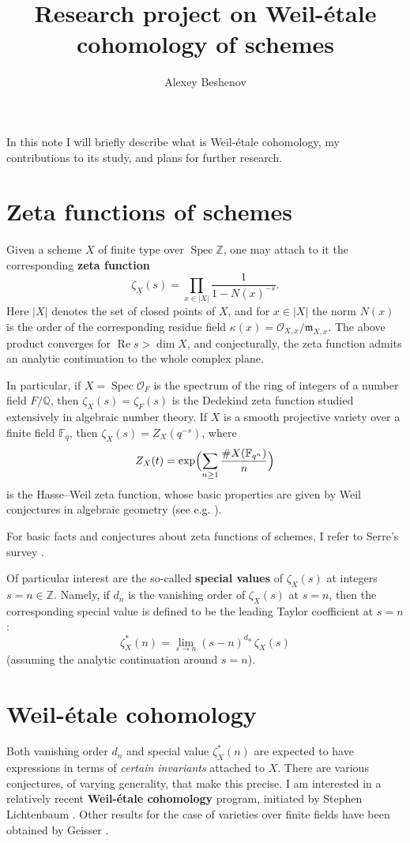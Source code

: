 \documentclass{article}
\author{Alexey Beshenov}
\title{Research project on Weil-étale cohomology of schemes}
\DeclareMathOperator{\Spec}{Spec}
\newcommand{\ZZ}{\mathbb{Z}}
\newcommand{\FF}{\mathbb{F}}
\newcommand{\QQ}{\mathbb{Q}}
\renewcommand{\Re}{\operatorname{Re}}
\begin{document}
\maketitle

In this note I will briefly describe what is Weil-étale cohomology,
my contributions to its study, and plans for further research.

\section{Zeta functions of schemes}

Given a scheme $X$ of finite type over $\Spec \ZZ$, one may attach to it the
corresponding \textbf{zeta function}
$$\zeta_X (s) = \prod_{x \in |X|} \frac{1}{1 - N (x)^{-s}}.$$
Here $|X|$ denotes the set of closed points of $X$, and for $x \in |X|$ the norm
$N (x)$ is the order of the corresponding residue field
$\kappa (x) = \mathcal{O}_{X,x}/\mathfrak{m}_{X,x}$. The above product converges
for $\Re s > \dim X$, and conjecturally, the zeta function admits an analytic
continuation to the whole complex plane.

In particular, if $X = \Spec \mathcal{O}_F$ is the spectrum of the ring of
integers of a number field $F/\QQ$, then $\zeta_X (s) = \zeta_F (s)$ is the
Dedekind zeta function studied extensively in algebraic number theory. If $X$ is
a smooth projective variety over a finite field $\FF_q$, then
$\zeta_X (s) = Z_X (q^{-s})$, where
$$Z_X (t) = \exp \Bigl(\sum_{n\ge 1} \frac{\# X (\FF_{q^n})}{n}\Bigr)$$
is the Hasse--Weil zeta function, whose basic properties are given by Weil
conjectures in algebraic geometry (see e.g. \cite{Katz-Motives}).

For basic facts and conjectures about zeta functions of schemes, I refer to
Serre's survey \cite{Serre-65}.

Of particular interest are the so-called \textbf{special values} of
$\zeta_X (s)$ at integers $s = n \in \ZZ$. Namely, if $d_n$ is the vanishing
order of $\zeta_X (s)$ at $s = n$, then the corresponding special value is
defined to be the leading Taylor coefficient at $s = n$:
$$\zeta_X^* (n) = \lim_{s \to n} (s - n)^{d_n}\,\zeta_X (s)$$
(assuming the analytic continuation around $s = n$).

\section{Weil-étale cohomology}

Both vanishing order $d_n$ and special value $\zeta_X^* (n)$ are expected to
have expressions in terms of \emph{certain invariants} attached to $X$. There
are various conjectures, of varying generality, that make this precise.  I am
interested in a relatively recent \textbf{Weil-étale cohomology} program,
initiated by Stephen Lichtenbaum
\cite{Lichtenbaum-05,Lichtenbaum-09-Euler,Lichtenbaum-09-number-rings}.  Other
results for the case of varieties over finite fields have been obtained by
Geisser \cite{Geisser-2004,Geisser-2006}.
\end{document}

